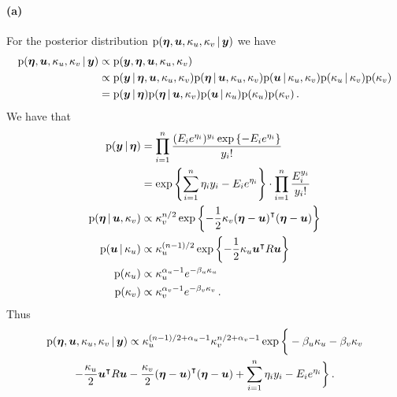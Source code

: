 \section{}
\label{sec:ex1}

\paragraph{(a)}
For the posterior distribution $\mathrm{p}(\bm{\eta}, \bm{u}, \kappa_u, \kappa_v \, | \, \bm{y})$ we have
%
\begin{align*}
    \mathrm{p}(\bm{\eta}, \bm{u}, \kappa_u, \kappa_v \, | \, \bm{y}) &\propto \mathrm{p}(\bm{y}, \bm{\eta}, \bm{u}, \kappa_u, \kappa_v) \\
    &\propto \mathrm{p}(\bm{y} \, | \, \bm{\eta}, \bm{u}, \kappa_u, \kappa_v) \mathrm{p}(\bm{\eta} \, | \, \bm{u}, \kappa_u, \kappa_v) \mathrm{p}(\bm{\bm{u}} \, | \, \kappa_u, \kappa_v) \mathrm{p}(\kappa_u \, | \, \kappa_v) \mathrm{p}(\kappa_v) \\
    &= \mathrm{p}(\bm{y} \, | \, \bm{\eta}) \mathrm{p}(\bm{\eta} \, | \, \bm{u}, \kappa_v) \mathrm{p}(\bm{\bm{u}} \, | \, \kappa_u) \mathrm{p}(\kappa_u) \mathrm{p}(\kappa_v) \, .
\end{align*}
%
We have that
%
\begin{equation}
\begin{split}
\label{eq:conditionals}
    \mathrm{p}(\bm{y} \, | \, \bm{\eta}) &= \prod_{i=1}^n \frac{(E_i e^{\eta_i})^{y_i} \exp \left\{-E_i e^{\eta_i}\right\}}{y_i!} \\
    &= \exp \left\{\sum_{i=1}^n \eta_i y_i - E_i e^{\eta_i}\right\} \cdot \prod_{i=1}^n \frac{E_i^{y_i}}{y_i!} \\
    \mathrm{p}(\bm{\eta} \, | \, \bm{u}, \kappa_v) &\propto \kappa_v^{n/2} \exp \left\{- \frac{1}{2} \kappa_v {(\bm{\eta} - \bm{u})}^\intercal(\bm{\eta} - \bm{u})\right\} \\
    \mathrm{p}(\bm{u} \, | \, \kappa_u) &\propto \kappa_u^{(n-1)/2} \exp \left\{-\frac{1}{2}\kappa_u {\bm{u}}^\intercal R\bm{u}\right\} \\
    \mathrm{p}(\kappa_u) &\propto \kappa_u^{\alpha_u - 1} e^{-\beta_u \kappa_u} \\
    \mathrm{p}(\kappa_v) &\propto \kappa_v^{\alpha_v - 1} e^{-\beta_v \kappa_v} \, .
\end{split}
\end{equation}
%
Thus
%
\begin{multline*}
    \mathrm{p}(\bm{\eta}, \bm{u}, \kappa_u, \kappa_v \, | \, \bm{y}) \propto \kappa_u^{(n-1)/2 + \alpha_u - 1} \kappa_v^{n/2 + \alpha_v - 1} \exp \bigg\{-\beta_u \kappa_u - \beta_v \kappa_v \\
    - \frac{\kappa_u}{2} {\bm{u}}^\intercal R \bm{u} - \frac{\kappa_v}{2} {(\bm{\eta} - \bm{u})}^\intercal (\bm{\eta} - \bm{u}) + \sum_{i=1}^n \eta_i y_i - E_i e^{\eta_i}\bigg\} \, .
\end{multline*}
%

